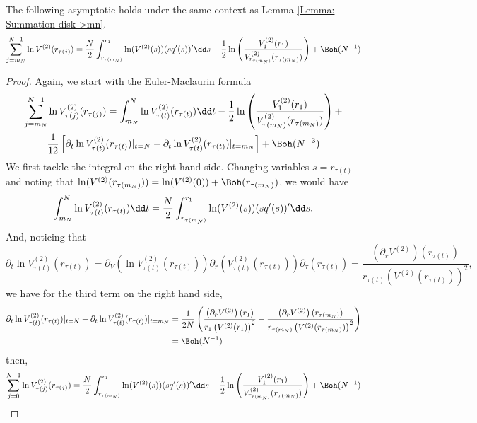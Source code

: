 \begin{proposicao}
	The following asymptotic holds under the same context as Lemma \ref{Lemma: Summation disk >mn}.
	\begin{equation}
		\sum_{j=m_N}^{N-1} \ln V^{(2)}(r_{\tau(j)}) = \frac{N}{2} \int_{r_{\tau(m_N)}}^{r_1} \ln(V^{(2)}(s)) (sq'(s))' \dd s  -   \frac{1}{2} \ln \left( \frac{V^{(2)}_{1}(r_1)}{V^{(2)}_{r_{\tau(m_N)}}(r_{\tau(m_N)})} \right) + \Boh(N^{-1})
	\end{equation}
\end{proposicao}
\begin{proof}
	Again, we start with the Euler-Maclaurin formula
		\begin{multline}
		\sum_{j=m_N}^{N-1}  \ln V^{(2)}_{\tau(j)}(r_{\tau(j)}) = \int_{m_N}^{N} \ln V^{(2)}_{\tau(t)}(r_{\tau(t)}) \dd t - \frac{1}{2} \ln \left( \frac{V^{(2)}_{1}(r_1)}{V^{(2)}_{\tau(m_N)}(r_{\tau(m_N)})} \right) + \\ \frac{1}{12} \left[ \partial_t \ln V^{(2)}_{\tau(t)}(r_{\tau(t)}) |_{t=N} - \partial_t \ln V^{(2)}_{\tau(t)}(r_{\tau(t)}) |_{t=m_N}\right]  + \Boh(N^{-3})
	\end{multline}
	We first tackle the integral on the right hand side. Changing variables $s = r_{\tau(t)}$ and noting that $\ln(V^{(2)}(r_{\tau(m_N)})) = \ln(V^{(2)}(0)) + \Boh(r_{\tau(m_N)})$, we would have
	\begin{equation}
		\int_{m_N}^{N} \ln V^{(2)}_{\tau(t)}(r_{\tau(t)}) \dd t = \frac{N}{2} \int_{r_{\tau(m_N)}}^{r_1} \ln(V^{(2)}(s)) (sq'(s))' \dd s. \\
	\end{equation}
	And, noticing that
	\begin{equation}
		\partial_t \ln V^{(2)}_{\tau(t)}(r_{\tau(t)}) = \partial_V \left( \ln V^{(2)}_{\tau(t)}(r_{\tau(t)}) \right) \partial_r \left( V^{(2)}_{\tau(t)}(r_{\tau(t)}) \right) \partial_\tau \left( r_{\tau(t)} \right) = \frac{\left(\partial_r V^{(2)}\right)(r_{\tau(t)})}{r_{\tau(t)} \left( V^{(2)}(r_{\tau(t)})\right)^2},
	\end{equation}
	we have for the third term on the right hand side, 
	\begin{align}
		\partial_t \ln V^{(2)}_{\tau(t)}(r_{\tau(t)}) |_{t=N} - \partial_t \ln V^{(2)}_{\tau(t)}(r_{\tau(t)}) |_{t=m_N} & = \frac{1}{2N} \left( \frac{\left(\partial_r V^{(2)}\right)(r_{1})}{r_1 \left( V^{(2)}(r_1)\right)^2} - \frac{\left(\partial_r V^{(2)}\right)(r_{\tau(m_N)})}{r_{\tau(m_N)} \left( V^{(2)}(r_{\tau(m_N)})\right)^2}\right) \\ & = \Boh(N^{-1})
	\end{align}
	then,
	\begin{equation}
		\sum_{j=0}^{N-1}  \ln V^{(2)}_{\tau(j)}(r_{\tau(j)})  = \frac{N}{2} \int_{r_{\tau(m_N)}}^{r_1} \ln(V^{(2)}(s)) (sq'(s))' \dd s  -   \frac{1}{2} \ln \left( \frac{V^{(2)}_{1}(r_1)}{V^{(2)}_{r_{\tau(m_N)}}(r_{\tau(m_N)})} \right) + \Boh(N^{-1})
		\label{Equation: logV annulus}
	\end{equation}
\end{proof}


